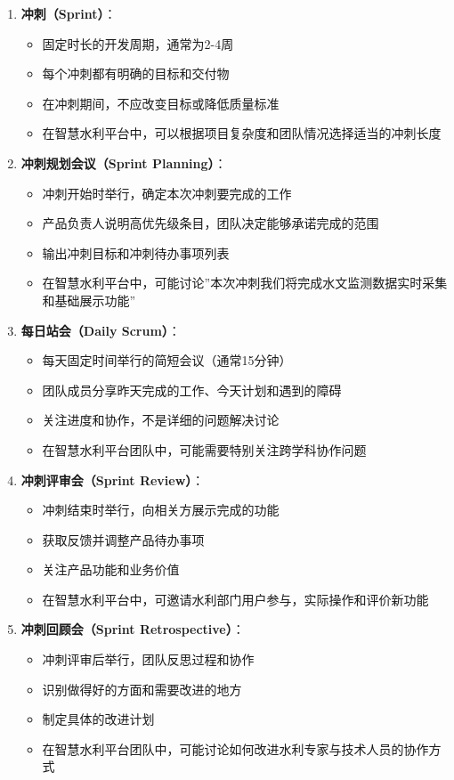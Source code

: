 \begin{enumerate}
\def\labelenumi{\arabic{enumi}.}
\tightlist
\item
  \textbf{冲刺（Sprint）}：

  \begin{itemize}
  \tightlist
  \item
    固定时长的开发周期，通常为2-4周
  \item
    每个冲刺都有明确的目标和交付物
  \item
    在冲刺期间，不应改变目标或降低质量标准
  \item
    在智慧水利平台中，可以根据项目复杂度和团队情况选择适当的冲刺长度
  \end{itemize}
\item
  \textbf{冲刺规划会议（Sprint Planning）}：

  \begin{itemize}
  \tightlist
  \item
    冲刺开始时举行，确定本次冲刺要完成的工作
  \item
    产品负责人说明高优先级条目，团队决定能够承诺完成的范围
  \item
    输出冲刺目标和冲刺待办事项列表
  \item
    在智慧水利平台中，可能讨论''本次冲刺我们将完成水文监测数据实时采集和基础展示功能''
  \end{itemize}
\item
  \textbf{每日站会（Daily Scrum）}：

  \begin{itemize}
  \tightlist
  \item
    每天固定时间举行的简短会议（通常15分钟）
  \item
    团队成员分享昨天完成的工作、今天计划和遇到的障碍
  \item
    关注进度和协作，不是详细的问题解决讨论
  \item
    在智慧水利平台团队中，可能需要特别关注跨学科协作问题
  \end{itemize}
\item
  \textbf{冲刺评审会（Sprint Review）}：

  \begin{itemize}
  \tightlist
  \item
    冲刺结束时举行，向相关方展示完成的功能
  \item
    获取反馈并调整产品待办事项
  \item
    关注产品功能和业务价值
  \item
    在智慧水利平台中，可邀请水利部门用户参与，实际操作和评价新功能
  \end{itemize}
\item
  \textbf{冲刺回顾会（Sprint Retrospective）}：

  \begin{itemize}
  \tightlist
  \item
    冲刺评审后举行，团队反思过程和协作
  \item
    识别做得好的方面和需要改进的地方
  \item
    制定具体的改进计划
  \item
    在智慧水利平台团队中，可能讨论如何改进水利专家与技术人员的协作方式
  \end{itemize}
\end{enumerate}

